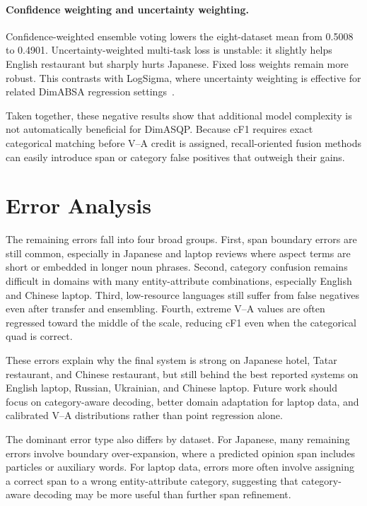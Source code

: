 \documentclass[runningheads]{llncs}
\begin{document}
\paragraph{Confidence weighting and uncertainty weighting.}
Confidence-weighted ensemble voting lowers the eight-dataset mean from
0.5008 to 0.4901. Uncertainty-weighted multi-task loss is unstable:
it slightly helps English restaurant but sharply hurts Japanese. Fixed
loss weights remain more robust. This contrasts with LogSigma, where
uncertainty weighting is effective for related DimABSA regression
settings~\cite{logsigma2026}.

Taken together, these negative results show that additional model
complexity is not automatically beneficial for DimASQP. Because cF1
requires exact categorical matching before V--A credit is assigned,
recall-oriented fusion methods can easily introduce span or category
false positives that outweigh their gains.

\section{Error Analysis}

The remaining errors fall into four broad groups. First, span boundary
errors are still common, especially in Japanese and laptop reviews
where aspect terms are short or embedded in longer noun phrases.
Second, category confusion remains difficult in domains with many
entity-attribute combinations, especially English and Chinese laptop.
Third, low-resource languages still suffer from false negatives even
after transfer and ensembling. Fourth, extreme V--A values are often
regressed toward the middle of the scale, reducing cF1 even when the
categorical quad is correct.

These errors explain why the final system is strong on Japanese hotel,
Tatar restaurant, and Chinese restaurant, but still behind the best
reported systems on English laptop, Russian, Ukrainian, and Chinese
laptop. Future work should focus on category-aware decoding, better
domain adaptation for laptop data, and calibrated V--A distributions
rather than point regression alone.

The dominant error type also differs by dataset. For Japanese, many
remaining errors involve boundary over-expansion, where a predicted
opinion span includes particles or auxiliary words. For laptop data,
errors more often involve assigning a correct span to a wrong
entity-attribute category, suggesting that category-aware decoding may
be more useful than further span refinement.
\end{document}
